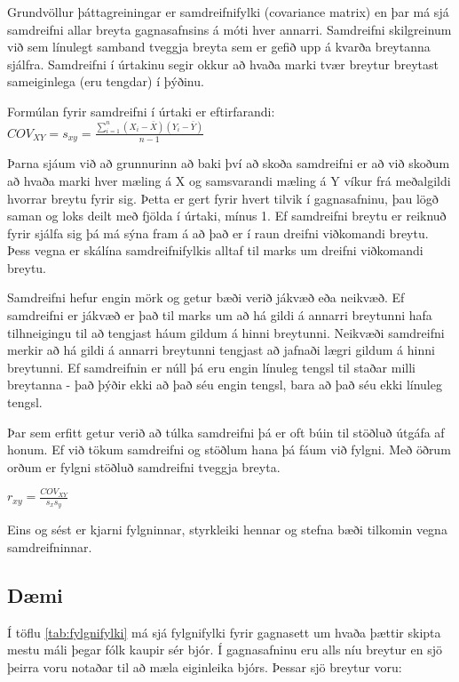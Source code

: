\documentclass[]{book}
\begin{document}
Grundvöllur þáttagreiningar er samdreifnifylki (covariance matrix) en þar má sjá samdreifni allar breyta gagnasafnsins á móti hver annarri. Samdreifni skilgreinum við sem línulegt samband tveggja breyta sem er gefið upp á kvarða breytanna sjálfra. Samdreifni í úrtakinu segir okkur að hvaða marki tvær breytur breytast sameiginlega (eru tengdar) í þýðinu.

Formúlan fyrir samdreifni í úrtaki er eftirfarandi:
\(COV_{XY} = s_{xy} = \frac{\sum\limits_{i=1}^{n}{(X_{i}-\bar{X})(Y_{i}-\bar{Y})} }{n-1}\)

Þarna sjáum við að grunnurinn að baki því að skoða samdreifni er að við skoðum að hvaða marki hver mæling á X og samsvarandi mæling á Y víkur frá meðalgildi hvorrar breytu fyrir sig. Þetta er gert fyrir hvert tilvik í gagnasafninu, þau lögð saman og loks deilt með fjölda í úrtaki, mínus 1. Ef samdreifni breytu er reiknuð fyrir sjálfa sig þá má sýna fram á að það er í raun dreifni viðkomandi breytu. Þess vegna er skálína samdreifnifylkis alltaf til marks um dreifni viðkomandi breytu.

Samdreifni hefur engin mörk og getur bæði verið jákvæð eða neikvæð. Ef samdreifni er jákvæð er það til marks um að há gildi á annarri breytunni hafa tilhneigingu til að tengjast háum gildum á hinni breytunni. Neikvæði samdreifni merkir að há gildi á annarri breytunni tengjast að jafnaði lægri gildum á hinni breytunni. Ef samdreifnin er núll þá eru engin línuleg tengsl til staðar milli breytanna - það þýðir ekki að það séu engin tengsl, bara að það séu ekki línuleg tengsl.

Þar sem erfitt getur verið að túlka samdreifni þá er oft búin til stöðluð útgáfa af honum. Ef við tökum samdreifni og stöðlum hana þá fáum við fylgni. Með öðrum orðum er fylgni stöðluð samdreifni tveggja breyta.

\(r_{xy}=\frac{COV_{XY}}{s_{x}s_{y} }\)

Eins og sést er kjarni fylgninnar, styrkleiki hennar og stefna bæði tilkomin vegna samdreifninnar.

\hypertarget{duxe6mi-1}{%
\subsection{Dæmi}\label{duxe6mi-1}}

Í töflu \ref{tab:fylgnifylki} má sjá fylgnifylki fyrir gagnasett um hvaða þættir skipta mestu máli þegar fólk kaupir sér bjór. Í gagnasafninu eru alls níu breytur en sjö þeirra voru notaðar til að mæla eiginleika bjórs. Þessar sjö breytur voru:
\end{document}
